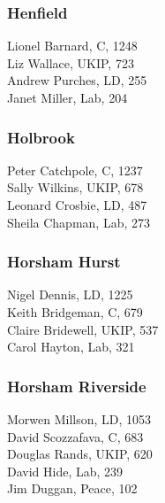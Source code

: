 \documentclass[a4paper,openany,10pt]{book}
\begin{document}
\subsubsection*{Henfield}



Lionel Barnard, C, 1248\\
Liz Wallace, UKIP, 723\\
Andrew Purches, LD, 255\\
Janet Miller, Lab, 204\\


\subsubsection*{Holbrook}



Peter Catchpole, C, 1237\\
Sally Wilkins, UKIP, 678\\
Leonard Crosbie, LD, 487\\
Sheila Chapman, Lab, 273\\


\subsubsection*{Horsham Hurst}



Nigel Dennis, LD, 1225\\
Keith Bridgeman, C, 679\\
Claire Bridewell, UKIP, 537\\
Carol Hayton, Lab, 321\\


\subsubsection*{Horsham Riverside}



Morwen Millson, LD, 1053\\
David Scozzafava, C, 683\\
Douglas Rands, UKIP, 620\\
David Hide, Lab, 239\\
Jim Duggan, Peace, 102\\
\end{document}
